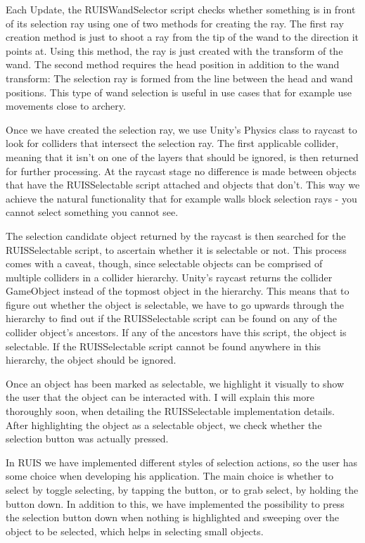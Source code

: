 \documentclass[12pt,a4paper,oneside,pdftex]{report}
\begin{document}
Each Update, the RUISWandSelector script checks whether something is in front of its selection ray using one of two methods for creating the ray. The first ray creation method is just to shoot a ray from the tip of the wand to the direction it points at. Using this method, the ray is just created with the transform of the wand. The second method requires the head position in addition to the wand transform: The selection ray is formed from the line between the head and wand positions. This type of wand selection is useful in use cases that for example use movements close to archery.

Once we have created the selection ray, we use Unity's Physics class to raycast to look for colliders that intersect the selection ray. The first applicable collider, meaning that it isn't on one of the layers that should be ignored, is then returned for further processing. At the raycast stage no difference is made between objects that have the RUISSelectable script attached and objects that don't. This way we achieve the natural functionality that for example walls block selection rays - you cannot select something you cannot see.

The selection candidate object returned by the raycast is then searched for the RUISSelectable script, to ascertain whether it is selectable or not. This process comes with a caveat, though, since selectable objects can be comprised of multiple colliders in a collider hierarchy. Unity's raycast returns the collider GameObject instead of the topmost object in the hierarchy. This means that to figure out whether the object is selectable, we have to go upwards through the hierarchy to find out if the RUISSelectable script can be found on any of the collider object's ancestors. If any of the ancestors have this script, the object is selectable. If the RUISSelectable script cannot be found anywhere in this hierarchy, the object should be ignored.

Once an object has been marked as selectable, we highlight it visually to show the user that the object can be interacted with. I will explain this more thoroughly soon, when detailing the RUISSelectable implementation details. After highlighting the object as a selectable object, we check whether the selection button was actually pressed.

In RUIS we have implemented different styles of selection actions, so the user has some choice when developing his application. The main choice is whether to select by toggle selecting, by tapping the button, or to grab select, by holding the button down. In addition to this, we have implemented the possibility to press the selection button down when nothing is highlighted and sweeping over the object to be selected, which helps in selecting small objects.
\end{document}
